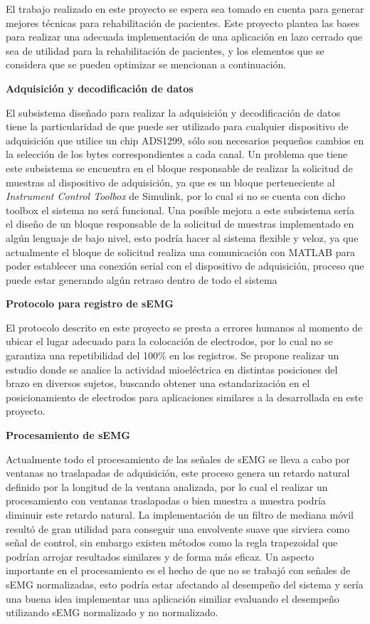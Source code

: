 
El trabajo realizado en este proyecto se espera sea tomado en cuenta para generar mejores técnicas para rehabilitación de pacientes. Este proyecto plantea las bases para realizar una adecuada implementación de una aplicación en lazo cerrado que sea de utilidad para la rehabilitación de pacientes, y los elementos que se considera que se pueden optimizar se mencionan a continuación.
\hfill \break

\textbf{Adquisición y decodificación de datos}
\hfill \break

El subsistema diseñado para realizar la adquisición y decodificación de datos tiene la particularidad de que puede ser utilizado para cualquier dispositivo de adquisición que utilice un chip ADS1299, sólo son necesarios pequeños cambios en la selección de los bytes correspondientes a cada canal. Un problema que tiene este subsistema se encuentra en el bloque responsable de realizar la solicitud de muestras al dispositivo de adquisición, ya que es un bloque perteneciente al \emph{Instrument Control Toolbox} de Simulink, por lo cual si no se cuenta con dicho toolbox el sistema no será funcional. Una posible mejora a este subsistema sería el diseño de un bloque responsable de la solicitud de muestras implementado en algún lenguaje de bajo nivel, esto podría hacer al sistema flexible y veloz, ya que actualmente el bloque de solicitud realiza una comunicación con MATLAB para poder establecer una conexión serial con el dispositivo de adquisición, proceso que puede estar generando algún retraso dentro de todo el sistema
\hfill \break

\textbf{Protocolo para registro de sEMG}
\hfill \break

El protocolo descrito en este proyecto se presta a errores humanos al momento de ubicar el lugar adecuado para la colocación de electrodos, por lo cual no se garantiza una repetibilidad del 100$\%$ en los registros. Se propone realizar un estudio donde se analice la actividad mioeléctrica en distintas posiciones del brazo en diversos sujetos, buscando obtener una estandarización en el posicionamiento de electrodos para aplicaciones similares a la desarrollada en este proyecto.
\hfill \break

\textbf{Procesamiento de sEMG}
\hfill \break

Actualmente todo el procesamiento de las señales de sEMG se lleva a cabo por ventanas no traslapadas de adquisición, este proceso genera un retardo natural definido por la longitud de la ventana analizada, por lo cual el realizar un procesamiento con ventanas traslapadas o bien muestra a muestra podría diminuir este retardo natural. La implementación de un filtro de mediana móvil resultó de gran utilidad para conseguir una envolvente suave que sirviera como señal de control, sin embargo existen métodos como la regla trapezoidal que podrían arrojar resultados similares y de forma más eficaz. Un aspecto importante en el procesamiento es el hecho de que no se trabajó con señales de sEMG normalizadas, esto podría estar afectando al desempeño del sistema y sería una buena idea implementar una aplicación similiar evaluando el desempeño utilizando sEMG normalizado y no normalizado.
\hfill \break

